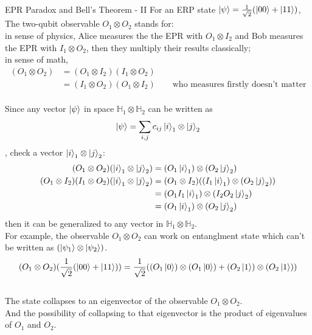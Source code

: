 \documentclass{beamer}
\begin{document}
\begin{frame}{EPR Paradox and Bell's Theorem - II}
  {\tiny
    For an ERP state $\ket{\psi} = \frac{1}{\sqrt{2}}(\ket{00} + \ket{11})$,
    The two-qubit observable $O_1 \otimes O_2$ stands for: \\
    in sense of physics, Alice measures the the EPR with $O_1 \otimes I_2$ and
    Bob measures the EPR with $I_1 \otimes O_2$, then they multiply their results classically; \\
    in sense of math,
    \begin{align*}
      (O_1 \otimes O_2) &= (O_1 \otimes I_2) (I_1 \otimes O_2) \\
                        &= (I_1 \otimes O_2) (O_1 \otimes I_2)  \qquad \text{who measures firstly doesn't matter}
    \end{align*} \\
    Since any vector $\ket{\psi}$ in space $\mathbb{H}_1 \otimes \mathbb{H}_2$ can be written as
    $$\ket{\psi} = \sum_{i, j} c_{ij} \ket{i}_1 \otimes \ket{j}_2$$,
    check a vector $\ket{i}_1 \otimes \ket{j}_2$:
    \begin{align*}
      (O_1 \otimes O_2) (\ket{i}_1 \otimes \ket{j}_2) &= (O_1 \ket{i}_1) \otimes (O_2 \ket{j}_2) \\
      (O_1 \otimes I_2) (I_1 \otimes O_2) (\ket{i}_1 \otimes \ket{j}_2) &=  (O_1 \otimes I_2) ( (I_1 \ket{i}_1) \otimes (O_2 \ket{j}_2) ) \\
                                                                        &= (O_1 I_1 \ket{i}_1) \otimes (I_2 O_2 \ket{j}_2) \\
                                                                        &= (O_1 \ket{i}_1) \otimes (O_2 \ket{j}_2)
    \end{align*}
    then it can be generalized to any vector in $\mathbb{H}_1 \otimes \mathbb{H}_2$. \\
    For example, the observable $O_1 \otimes O_2$ can work on entanglment state which can't be
    written as $(\ket{\psi_1} \otimes \ket{\psi_2})$.
    \begin{align*}
      (O_1 \otimes O_2) ( \frac{1}{\sqrt{2}}(\ket{00} + \ket{11}) ) =
      \frac{1}{\sqrt{2}} ( (O_1 \ket{0}) \otimes (O_1 \ket{0}) + (O_2 \ket{1}) \otimes (O_2 \ket{1}) )
    \end{align*} \\
    The state collapses to an eigenvector of the observable $O_1 \otimes O_2$. \\
    And the possibility of collapsing to that eigenvector is the product of eigenvalues of $O_1$ and $O_2$. \\

  }%
\end{frame}
\end{document}
